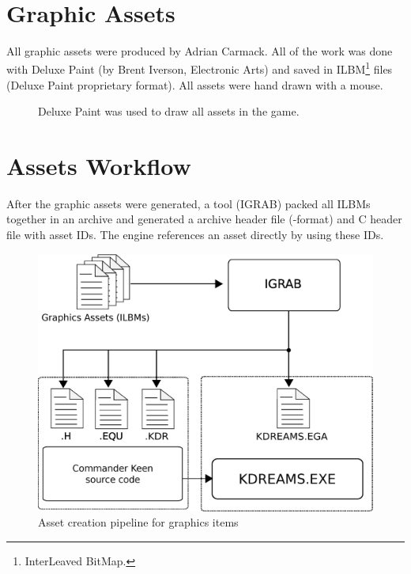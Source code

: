\documentclass[book.tex]{subfiles}
\begin{document}
  \\
\vspace{-5pt}  
\par
\vspace{5pt}
\section{Graphic Assets}

All graphic assets were produced by Adrian Carmack. All of the work was done with Deluxe Paint (by Brent Iverson, Electronic Arts) and saved in ILBM\footnote{InterLeaved BitMap.} files (Deluxe Paint proprietary format). All assets were hand drawn with a mouse.

\begin{figure}[H]
  \centering
 \caption{Deluxe Paint was used to draw all assets in the game.}
\end{figure}


\section{Assets Workflow}
After the graphic assets were generated, a tool (IGRAB) packed all ILBMs together in an archive and generated a archive header file (-format) and C header file with asset IDs. The engine references an asset directly by using these IDs.\\
\begin{figure}[H]
\centering
 \includegraphics[width=.9\textwidth]{imgs/drawings/drawing_plain.eps}
 \caption{Asset creation pipeline for graphics items}
 \label{asset-creation-pipeline}
\end{figure}
\par
\begin{minipage}{\textwidth}
 \par
 \end{minipage}
 
\end{document}
